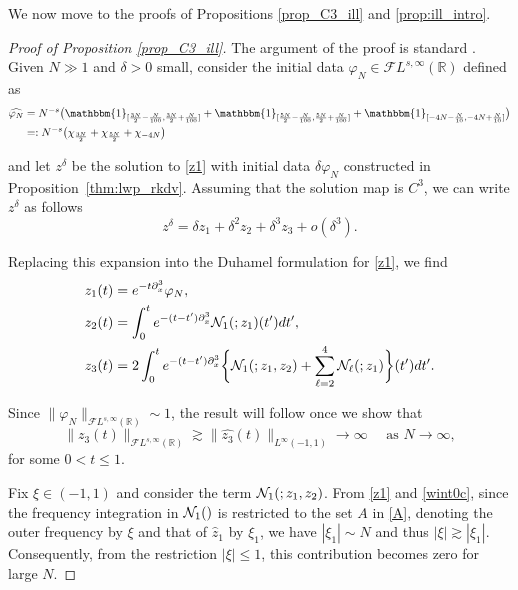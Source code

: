 \documentclass[a4paper,
11pt,  reqno]{amsart}
\makeatletter
\newcommand{\5}{\textup{V}}
\newcommand{\noi}{\noindent}
\newcommand{\FL}{\mathcal{F} L}
\newcommand{\ft}{\widehat}
\newcommand{\F}{\mathcal{F}}
\newcommand{\dx}{\partial_x}
\theoremstyle{remark}
\newcommand{\R}{\mathbb{R}}
\renewcommand{\l}{\ell}
\newcommand{\ges}{\gtrsim}
\def\<#1>{\csname MH@symb@#1\endcsname}
\numberwithin{equation}{section}
\numberwithin{theorem}{section}
\newcommand{\Ncal}{\mathcal{N}}
\makeatother
\begin{document}
We now move to the proofs of Propositions \ref{prop_C3_ill} and \ref{prop:ill_intro}.

\begin{proof}[Proof of Proposition \ref{prop_C3_ill}]
The argument of the proof is standard \cite{taobejenaru, bou_ill_kdv, MolTzeSaut_ill, Tzvetkov_ill}.
    Given $N\gg 1$ and $\delta>0$ small, consider the initial data $\varphi_N\in \mathcal{F}L^{s,\infty}(\R)$ defined as
\begin{align}
        \widehat{\varphi_N}&=N^{-s}\big(\mathbbm{1}_{[\frac{3N}{2}-\frac{N}{100}, \frac{3N}{2}+\frac{N}{100}]} + \mathbbm{1}_{[\frac{5N}{2}-\frac{N}{100}, \frac{5N}{2}+\frac{N}{100}]} + \mathbbm{1}_{[-4N-\frac{N}{10}, -4N+\frac{N}{10}]}\big)\\
        &=: N^{-s} \big(\chi_{\frac{3N}2}+ \chi_{\frac{5N}2} + \chi_{-4N} \big)
\end{align}


\noi
    and let $z^\delta$ be the solution to \eqref{z1} with initial data $\delta \varphi_N $ constructed in Proposition~\ref{thm:lwp_rkdv}. Assuming that the solution map is $C^3$, we can write $z^\delta$ as follows
    $$
    z^\delta = \delta z_1 + \delta^2z_2 + \delta^3 z_3 + o(\delta^3).
    $$

    \noi
    Replacing this expansion into the Duhamel formulation for \eqref{z1}, we find
    {
    \begin{align}
         z_1(t) &= e^{-t\dx^3} \varphi_N
        ,
        \\
         z_2 (t) &= \int_0^t e^{-(t-t')\dx^3}\Ncal_1(\<1>;  z_1) (t') dt'
        ,
        \\
         z_3 (t)
         &= 2 \int_0^t e^{-(t-t')\dx^3}
         \bigg\{ \Ncal_1(\<1>;  {z}_1, z_2)
         + \sum_{\l=2}^4\Ncal_\l(\<21>; z_1)
         \bigg\}(t') dt'
        .
        \label{eq:z3}
    \end{align}
}



    \noi
    Since $\|\varphi_N\|_{\F L^{s,\infty}(\R)}\sim 1$,
    the result will follow once we show that
   $$
    \|z_3(t)\|_{\FL^{s,\infty}(\R)} \gtrsim \| \ft{z_3}(t)\|_{ L^{\infty}(-1,1)}\to \infty \quad \mbox{ as }N\to \infty
    ,
    $$
for some {$0< t \le 1$}.

Fix $\xi\in(-1,1)$ and consider the term $\Ncal_1(\<1>; {z}_1, z_2)$.
From \eqref{z1} and \eqref{wint0c}, since the frequency integration in $\Ncal_1(\<1>)$ is restricted to the set $A$ in \eqref{A}, denoting the outer frequency by $\xi$ and that of $\ft{z}_1$ by $\xi_1$, we have $|\xi_1| \sim N $ and thus $|\xi| \ges |\xi_1|$. Consequently, from the restriction $|\xi| \le 1$, this contribution becomes zero for large $N$.








\end{proof}
\end{document}

